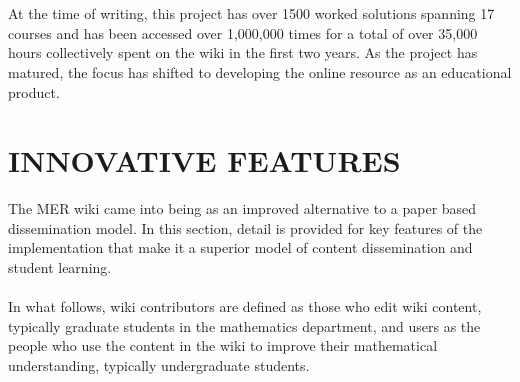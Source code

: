 \documentclass{primus}
\begin{document}
\\\\
\noindent{}At the time of writing, this project has over 1500 worked solutions spanning 17 courses and has been accessed over 1,000,000 times for a total of over 35,000 hours collectively spent on the wiki in the first two years. As the project has matured, the focus has shifted to developing the online resource as an educational product.

\section{INNOVATIVE FEATURES}\label{sec:Innovative_Features}
The MER wiki came into being as an improved alternative to a paper based dissemination model. In this section, detail is provided for key features of the implementation that make it a superior model of content dissemination and student learning.
\\\\
\noindent{}In what follows, wiki contributors are defined as those who edit wiki content, typically graduate students in the mathematics department, and users as the people who use the content in the wiki to improve their mathematical understanding, typically undergraduate students.
\end{document}
